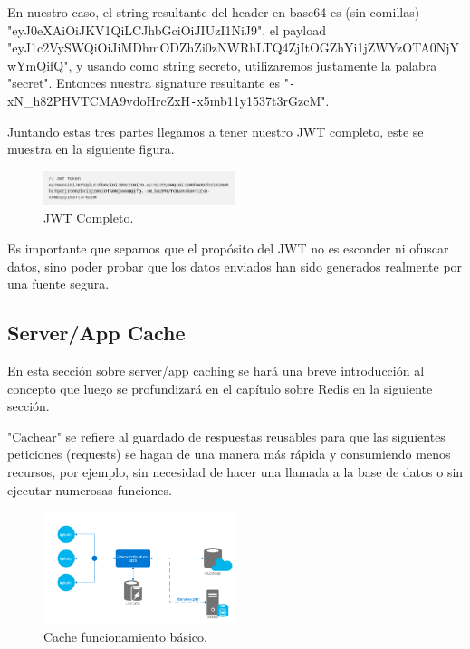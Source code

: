 \begin{itemize}
	En nuestro caso, el string resultante del header en base64 es (sin comillas) 
	"eyJ0eXAiOiJKV1QiLCJhbGciOiJIUzI1NiJ9", el payload 
	"eyJ1c2VySWQiOiJiMDhmODZhZi0zNWRhLTQ4ZjItOGZhYi1jZWYzOTA0NjYwYmQifQ", y usando como 
	string secreto, utilizaremos justamente la palabra "secret". Entonces nuestra signature 
	resultante es "\texttt{-}xN\_h82PHVTCMA9vdoHrcZxH\texttt{-}x5mb11y1537t3rGzcM".
	
	Juntando estas tres partes llegamos a tener nuestro JWT completo, este se muestra en 
	la siguiente figura.
	
	\begin{figure}[H] 
		\centering    
		\includegraphics[width=0.5\textwidth]{jwt4}
		\caption[JWT Complete]{JWT Completo.}
		\label{fig:jwt-complete}
	\end{figure}
	
\end{itemize}

Es importante que sepamos que el propósito del JWT no es esconder ni ofuscar datos, sino 
poder probar que los datos enviados han sido generados realmente por una fuente segura.


\subsection{Server/App Cache}

En esta sección sobre server/app caching se hará una breve introducción al concepto que
luego se profundizará en el capítulo sobre Redis en la siguiente sección.

"Cachear" se refiere al guardado de respuestas reusables para 
que las siguientes peticiones (requests) se hagan de una manera más rápida y consumiendo 
menos recursos, por ejemplo, sin necesidad de hacer una llamada a la base de datos o sin 
ejecutar numerosas funciones.


\begin{figure}[H] 
	\centering    
	\includegraphics[width=0.5\textwidth]{cache1}
	\caption[Cache]{Cache funcionamiento básico.}
	\label{fig:cache-basics}
\end{figure}

